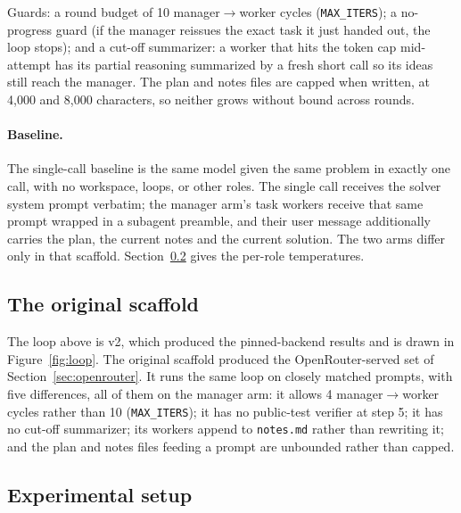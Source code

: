 \documentclass{article}
\begin{document}
Guards: a round budget of 10 manager$\to$worker cycles
(\texttt{MAX\_ITERS}); a no-progress guard (if the manager reissues the exact task it just
handed out, the loop stops); and a cut-off summarizer: a worker that hits the token cap
mid-attempt has its partial reasoning summarized by a fresh short call so its ideas still
reach the manager. The plan and notes files are capped when written, at 4,000 and 8,000
characters, so neither grows without bound across rounds.

\newpage
\paragraph{Baseline.} The single-call baseline is the same model given the same problem in exactly one call, with no
workspace, loops, or other roles. The single call receives the solver
system prompt verbatim; the manager arm's task workers receive that same prompt wrapped in a
subagent preamble, and their user message additionally
carries the plan, the current notes and the current solution. The two arms differ only in
that scaffold. Section~\ref{sec:setup} gives the per-role temperatures.

\subsection{The original scaffold}
\label{sec:scaffold-v1}

The loop above is v2, which produced the pinned-backend results and is drawn in
Figure~\ref{fig:loop}. The original scaffold produced the OpenRouter-served set of
Section~\ref{sec:openrouter}. It runs the same loop on closely matched prompts, with five
differences, all of them on the manager arm: it allows 4 manager$\to$worker cycles rather than 10
(\texttt{MAX\_ITERS}); it has no public-test verifier at step 5; it has no cut-off summarizer; its
workers append to \texttt{notes.md} rather than rewriting it; and the plan and notes files feeding
a prompt are unbounded rather than capped.

\subsection{Experimental setup}
\label{sec:setup}
\end{document}
